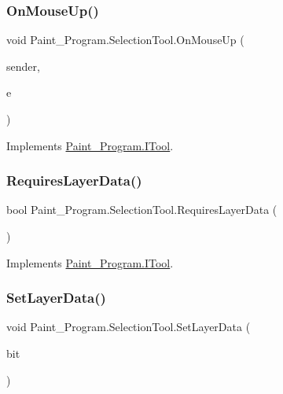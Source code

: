 \subsubsection{\texorpdfstring{On\+Mouse\+Up()}{OnMouseUp()}}
{\footnotesize\ttfamily void Paint\+\_\+\+Program.\+Selection\+Tool.\+On\+Mouse\+Up (\begin{DoxyParamCaption}\item[{object}]{sender,  }\item[{Mouse\+Event\+Args}]{e }\end{DoxyParamCaption})\hspace{0.3cm}{\ttfamily [inline]}}



Implements \mbox{\hyperlink{interface_paint___program_1_1_i_tool_a47984c2879213022f1684c07f7bba73e}{Paint\+\_\+\+Program.\+I\+Tool}}.

\mbox{\label{class_paint___program_1_1_selection_tool_a3e97ebc6bc62f194b42e2acdd24a498f}} 
\subsubsection{\texorpdfstring{Requires\+Layer\+Data()}{RequiresLayerData()}}
{\footnotesize\ttfamily bool Paint\+\_\+\+Program.\+Selection\+Tool.\+Requires\+Layer\+Data (\begin{DoxyParamCaption}{ }\end{DoxyParamCaption})\hspace{0.3cm}{\ttfamily [inline]}}



Implements \mbox{\hyperlink{interface_paint___program_1_1_i_tool_a6d45b6c48da8130ae41db3a66cdaef9a}{Paint\+\_\+\+Program.\+I\+Tool}}.

\mbox{\label{class_paint___program_1_1_selection_tool_a3975a7e8ef98db8f1edaa5fd586fa486}} 
\subsubsection{\texorpdfstring{Set\+Layer\+Data()}{SetLayerData()}}
{\footnotesize\ttfamily void Paint\+\_\+\+Program.\+Selection\+Tool.\+Set\+Layer\+Data (\begin{DoxyParamCaption}\item[{Bitmap}]{bit }\end{DoxyParamCaption})\hspace{0.3cm}{\ttfamily [inline]}}



